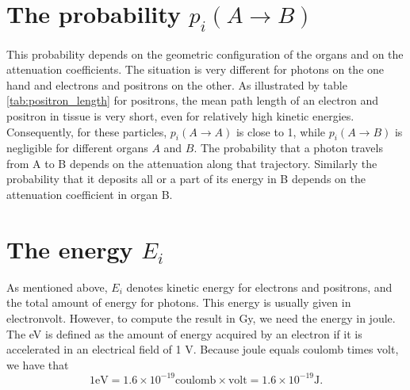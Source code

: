 \documentclass[11pt,oneside]{book}
\begin{document}
\section{The probability $p_i(A \rightarrow B)$}
This probability depends on the geometric configuration of the organs
and on the attenuation coefficients. The situation is very different
for photons on the one hand and electrons and positrons on the
other. As illustrated by table \ref{tab:positron_length} for
positrons, the mean path length of an electron and positron in tissue
is very short, even for relatively high kinetic
energies. Consequently, for these particles, $p_i(A \rightarrow A)$ is
close to 1, while $p_i(A \rightarrow B)$ is negligible for different
organs $A$ and $B$. The probability that a photon travels from A to B
depends on the attenuation along that trajectory. Similarly the
probability that it deposits all or a part of its energy in B depends
on the attenuation coefficient in organ B.


\section{The energy $E_i$}
As mentioned above, $E_i$ denotes kinetic energy for electrons and positrons,
and the total amount of energy for photons. This energy is usually given in
electronvolt. However, to compute the result in Gy, we need the energy in joule.
The eV is defined as the amount of energy acquired by an electron if it
is accelerated in an electrical field of 1 V. Because joule equals coulomb
times volt, we have that
\begin{equation}
 1 \mbox{eV} = 1.6 \times 10^{-19} \mbox{coulomb} \times \mbox{volt}
             = 1.6 \times 10^{-19} \mbox{J}.
\end{equation}
\end{document}
